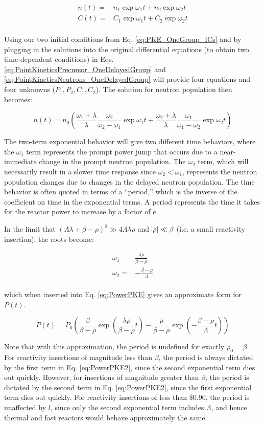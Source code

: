 \documentclass[10pt]{article}
\newcommand{\beq}{\begin{equation}}
\newcommand{\eeq}{\end{equation}}
\newcommand{\beqa}{\begin{equation}\begin{aligned}}
\newcommand{\eeqa}{\end{aligned}\end{equation}}
\begin{document}
\begin{flushleft}
\beqa
\label{eq:PKE_Solutions_OneGroup}
n(t)=&n_1\exp{\omega_1 t}+n_2\exp{\omega_2 t}\\
C(t)=&C_1\exp{\omega_1 t}+C_2\exp{\omega_2 t}\\
\eeqa 

Using our two initial conditions from Eq. \ref{eq:PKE_OneGroup_ICs} and by plugging in the solutions into the original differential equations (to obtain two time-dependent conditions) in Eqs. \ref{eq:PointKineticsPrecursor_OneDelayedGroup} and \ref{eq:PointKineticsNeutrons_OneDelayedGroup} will provide four equations and four unknowns (\(P_1, P_2, C_1, C_2\)). The solution for neutron population then becomes:

\beq
\label{eq:PowerPKE}
n(t)=n_0\left(\frac{\omega_1+\lambda}{\lambda}\frac{\omega_2}{\omega_2-\omega_1}\exp{\omega_1 t} + \frac{\omega_2+\lambda}{\lambda}\frac{\omega_1}{\omega_1-\omega_2}\exp{\omega_2 t}\right)
\eeq

The two-term exponential behavior will give two different time behaviors, where the \(\omega_1\) term represents the prompt power jump that occurs due to a near-immediate change in the prompt neutron population. The \(\omega_2\) term, which will necessarily result in a slower time response since \(\omega_2<\omega_1\), represents the neutron population changes due to changes in the delayed neutron population. The time behavior is often quoted in terms of a ``period,'' which is the inverse of the coefficient on time in the exponential terms. A period represents the time it takes for the reactor power to increase by a factor of \(e\).

In the limit that \((\Lambda\lambda+\beta-\rho)^2 \gg 4\Lambda\lambda\rho\) and \(\abs{\rho}\ll\beta\) (i.e. a small reactivity insertion), the roots become:

\beqa
\label{eq:omegaPKE2}
\omega_1=&\frac{\lambda\rho}{\beta-\rho}\\
\omega_2=&-\frac{\beta-\rho}{\Lambda}\\
\eeqa 

which when inserted into Eq. \ref{eq:PowerPKE} gives an approximate form for \(P(t)\).

\begin{equation}
\label{eq:PowerPKE2}
P(t)=P_0\left(\frac{\beta}{\beta-\rho}\exp{\left(\frac{\lambda\rho}{\beta-\rho} t\right)} - \frac{\rho}{\beta-\rho}\exp{\left(-\frac{\beta-\rho}{\Lambda} t\right)}\right)
\end{equation} 

Note that with this approximation, the period is undefined for exactly \(\rho_0=\beta\). For reactivity insertions of magnitude less than \(\beta\), the period is always dictated by the first term in Eq. \ref{eq:PowerPKE2}, since the second exponential term dies out quickly. However, for insertions of magnitude greater than \(\beta\), the period is dictated by the second term in Eq. \ref{eq:PowerPKE2}, since the first exponential term dies out quickly. For reactivity insertions of less than \$0.90, the period is unaffected by \(l\), since only the second exponential term includes \(\Lambda\), and hence thermal and fast reactors would behave approximately the same.


\end{flushleft}
\end{document}
